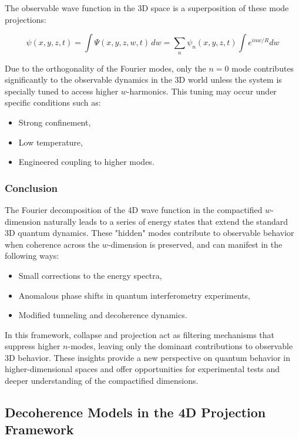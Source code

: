 \documentclass[12pt]{article}
\begin{document}
The observable wave function in the 3D space is a superposition of these mode projections:

\begin{equation}
\psi(x, y, z, t) = \int \Psi(x, y, z, w, t) \, dw = \sum_n \psi_n(x, y, z, t) \int e^{i n w / R} dw
\end{equation}

Due to the orthogonality of the Fourier modes, only the \( n = 0 \) mode contributes significantly to the observable dynamics in the 3D world unless the system is specially tuned to access higher \( w \)-harmonics. This tuning may occur under specific conditions such as:

\begin{itemize}
    \item Strong confinement,
    \item Low temperature,
    \item Engineered coupling to higher modes.
\end{itemize}

\subsubsection*{Conclusion}

The Fourier decomposition of the 4D wave function in the compactified \( w \)-dimension naturally leads to a series of energy states that extend the standard 3D quantum dynamics. These "hidden" modes contribute to observable behavior when coherence across the \( w \)-dimension is preserved, and can manifest in the following ways:

\begin{itemize}
    \item Small corrections to the energy spectra,
    \item Anomalous phase shifts in quantum interferometry experiments,
    \item Modified tunneling and decoherence dynamics.
\end{itemize}

In this framework, collapse and projection act as filtering mechanisms that suppress higher \( n \)-modes, leaving only the dominant contributions to observable 3D behavior. These insights provide a new perspective on quantum behavior in higher-dimensional spaces and offer opportunities for experimental tests and deeper understanding of the compactified dimensions.

\newpage

\subsection{Decoherence Models in the 4D Projection Framework}
\end{document}
